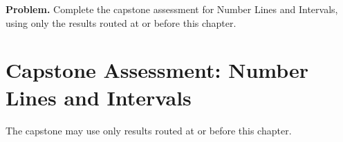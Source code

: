 \newpage
{}
\label{cap:number-lines}

\begin{tcolorbox}[
  colback=gray!6,
  colframe=gray!40,
  arc=2pt,
  left=8pt, right=8pt, top=6pt, bottom=6pt,
  title={\small\textbf{Capstone Problem}},
  fonttitle=\small\bfseries
]
\textbf{Problem.}
Complete the capstone assessment for Number Lines and Intervals, using only the results routed at or before this chapter.
\end{tcolorbox}

\section{Capstone Assessment: Number Lines and Intervals}

\begin{remark*}
The capstone may use only results routed at or before this chapter.
\end{remark*}

\clearpage